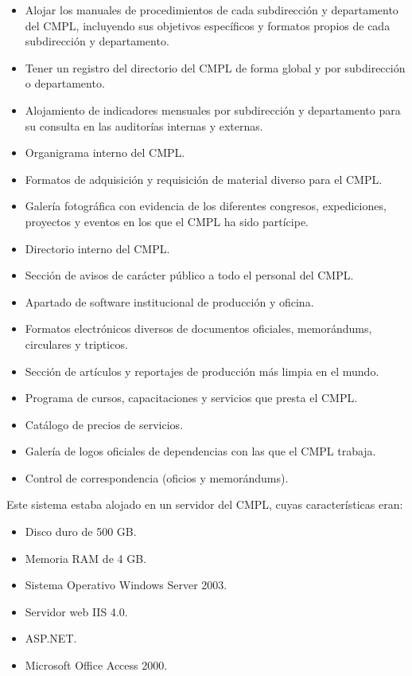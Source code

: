 	\begin{itemize}
		\item Alojar los manuales de procedimientos de cada subdirección y departamento del CMPL, incluyendo sus objetivos específicos y formatos propios de cada subdirección y departamento.
		\item Tener un registro del directorio del CMPL de forma global y por subdirección o departamento. 
		\item Alojamiento de indicadores mensuales por subdirección y departamento para su consulta en las auditorías internas y externas.
		\item Organigrama interno del CMPL.
		\item Formatos de adquisición y requisición de material diverso para el CMPL.
		\item Galería fotográfica con evidencia de los diferentes congresos, expediciones, proyectos y eventos en los que el CMPL ha sido partícipe.
		\item Directorio interno del CMPL.
		\item Sección de avisos de carácter público a todo el personal del CMPL. 
		\item Apartado de software institucional de producción y oficina.
		\item Formatos electrónicos diversos de documentos oficiales, memorándums, circulares y tripticos.
		\item Sección de artículos y reportajes de producción más limpia en el mundo.
		\item Programa de cursos, capacitaciones y servicios que presta el CMPL.
		\item Catálogo de precios de servicios.
		\item Galería de logos oficiales de dependencias con las que el CMPL trabaja.
		\item Control de correspondencia (oficios y memorándums).
	\end{itemize}
	
	Este sistema estaba alojado en un servidor del CMPL, cuyas características eran:
	
	\begin{itemize}
		\item Disco duro de 500 GB.
		\item Memoria RAM de 4 GB.
		\item Sistema Operativo Windows Server 2003.
		\item Servidor web IIS 4.0.
		\item ASP.NET.
		\item Microsoft Office Access 2000.
	\end{itemize}
	
